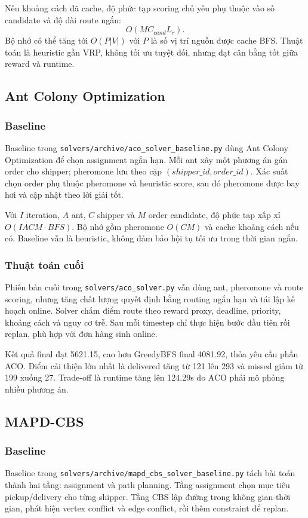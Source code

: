 \documentclass[conference]{IEEEtran}
\newcommand{\code}[1]{\texttt{#1}}
\begin{document}
Nếu khoảng cách đã cache, độ phức tạp scoring chủ yếu phụ thuộc vào số candidate và độ dài route ngắn:
\begin{equation}
O(MC_{cand}L_r).
\end{equation}
Bộ nhớ có thể tăng tới $O(P|V|)$ với $P$ là số vị trí nguồn được cache BFS. Thuật toán là heuristic gần VRP, không tối ưu tuyệt đối, nhưng đạt cân bằng tốt giữa reward và runtime.

\subsection{Ant Colony Optimization}
\subsubsection{Baseline}
Baseline trong \code{solvers/archive/aco\_solver\_baseline.py} dùng Ant Colony Optimization để chọn assignment ngắn hạn. Mỗi ant xây một phương án gán order cho shipper; pheromone lưu theo cặp $(shipper\_id, order\_id)$. Xác suất chọn order phụ thuộc pheromone và heuristic score, sau đó pheromone được bay hơi và cập nhật theo lời giải tốt.

Với $I$ iteration, $A$ ant, $C$ shipper và $M$ order candidate, độ phức tạp xấp xỉ $O(IACM \cdot BFS)$. Bộ nhớ gồm pheromone $O(CM)$ và cache khoảng cách nếu có. Baseline vẫn là heuristic, không đảm bảo hội tụ tối ưu trong thời gian ngắn.

\subsubsection{Thuật toán cuối}
Phiên bản cuối trong \code{solvers/aco\_solver.py} vẫn dùng ant, pheromone và route scoring, nhưng tăng chất lượng quyết định bằng routing ngắn hạn và tái lập kế hoạch online. Solver chấm điểm route theo reward proxy, deadline, priority, khoảng cách và nguy cơ trễ. Sau mỗi timestep chỉ thực hiện bước đầu tiên rồi replan, phù hợp với đơn hàng sinh online.

Kết quả final đạt 5621.15, cao hơn GreedyBFS final 4081.92, thỏa yêu cầu phần ACO. Điểm cải thiện lớn nhất là delivered tăng từ 121 lên 293 và missed giảm từ 199 xuống 27. Trade-off là runtime tăng lên 124.29s do ACO phải mô phỏng nhiều phương án.

\subsection{MAPD-CBS}
\subsubsection{Baseline}
Baseline trong \code{solvers/archive/mapd\_cbs\_solver\_baseline.py} tách bài toán thành hai tầng: assignment và path planning. Tầng assignment chọn mục tiêu pickup/delivery cho từng shipper. Tầng CBS lập đường trong không gian-thời gian, phát hiện vertex conflict và edge conflict, rồi thêm constraint để replan.
\end{document}
